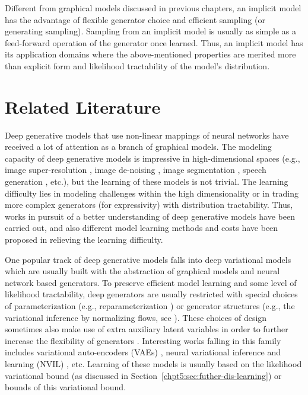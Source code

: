 Different from graphical models discussed in previous chapters, an implicit model has the advantage of flexible generator choice and efficient sampling (or generating sampling). Sampling from an implicit model is usually as simple as a feed-forward operation of the generator once learned. Thus, an implicit model has its application domains where the above-mentioned properties are merited more than explicit form and likelihood tractability of the model's distribution. 


\section{Related Literature}\label{chpt8:sec:literature}

Deep generative models that use non-linear mappings of neural networks have received a lot of attention as a branch of graphical models. The modeling capacity of deep generative models is impressive in high-dimensional spaces (e.g., image super-resolution \cite{ledig2017photo}, image de-noising \cite{CreswellB2017denoise, dilokthanakulmg2016gausian-vae}, image segmentation \cite{marvin2018crf}, speech generation \cite{ryan2018waveglow}, etc.), but the learning of these models is not trivial. The learning difficulty lies in modeling challenges within the high dimensionality or in trading more complex generators (for expressivity) with distribution tractability. Thus, works in pursuit of a better understanding of deep generative models have been carried out, and also different model learning methods and costs have been proposed in relieving the learning difficulty.

One popular track of deep generative models falls into deep variational models which are usually built with the abstraction of graphical models and neural network based generators. To preserve efficient model learning and some level of likelihood tractability, deep generators are usually restricted with special choices of parameterization (e.g., reparameterization \cite{DBLP:journals/corr/KingmaW13}) or generator structures (e.g., the variational inference by normalizing flows, see \cite{rezende2015variational, kingma2016IVF, TomczakW16vae-flow}). These choices of design sometimes also make use of extra auxiliary latent variables in order to further increase the flexibility of generators \cite{ranganath2015hierarchical}. Interesting works falling in this family includes variational auto-encoders (VAEs) \cite{kingma2019vae}, neural variational inference and learning (NVIL) \cite{kuleshov2017neural_variational, mnih14NVIL, Li2020To}, etc. Learning of these models is usually based on the likelihood variational bound (as discussed in Section~\ref{chpt5:sec:futher-dis-learning}) or bounds of this variational bound.

